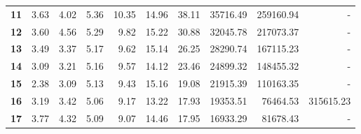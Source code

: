 \begin{table}[h]
\begin{center}
\begin{tabular}{crrrrrrrrr}
\textbf{11}                        & 3.63                           & 4.02                           & 5.36                           & 10.35                           & 14.96                           & 38.11                           & 35716.49                       & 259160.94                        & -                                \\
\textbf{12}                        & 3.60                           & 4.56                           & 5.29                           & 9.82                           & 15.22                           & 30.88                           & 32045.78                       & 217073.37                        & -                                \\
\textbf{13}                        & 3.49                           & 3.37                           & 5.17                           & 9.62                            & 15.14                           & 26.25                           & 28290.74                        & 167115.23                        & -                                \\
\textbf{14}                        & 3.09                           & 3.21                           & 5.16                           & 9.57                           & 14.12                           & 23.46                           & 24899.32                        & 148455.32                        & -                                \\
\textbf{15}                        & 2.38                           & 3.09                           & 5.13                           & 9.43                           & 15.16                           & 19.08                           & 21915.39                        & 110163.35                        & -                                \\
\textbf{16}                        & 3.19                           & 3.42                           & 5.06                           & 9.17                           & 13.22                           & 17.93                           & 19353.51                        & 76464.53                         & 315615.23                     \\
\textbf{17}                        & 3.77                           & 4.32                           & 5.09                           & 9.07                           & 14.46                           & 17.95                           & 16933.29                        & 81678.43                         & -                                \\

\end{tabular}
\end{center}
\end{table}
